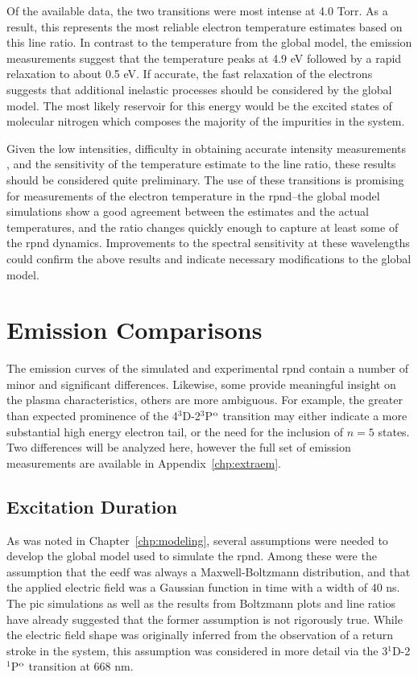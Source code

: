 Of the available data, the two transitions were most intense at 4.0 Torr. As a
result, this represents the most reliable electron temperature estimates based
on this line ratio. In contrast to the temperature from the global model, the
emission measurements suggest that the temperature peaks at 4.9 eV followed by a
rapid relaxation to about 0.5 eV. If accurate, the fast relaxation of the
electrons suggests that additional inelastic processes should be considered by
the global model. The most likely reservoir for this energy would be the excited
states of molecular nitrogen which composes the majority of the impurities in
the system.

Given the low intensities, difficulty in obtaining accurate intensity
measurements \cite{Griem2005}, and the sensitivity of the temperature estimate
to the line ratio, these results should be considered quite preliminary. The use
of these transitions is promising for measurements of the electron temperature
in the \acs{rpnd}--the global model simulations show a good agreement between
the estimates and the actual temperatures, and the ratio changes quickly enough
to capture at least some of the \acs{rpnd} dynamics. Improvements to the
spectral sensitivity at these wavelengths could confirm the above results and
indicate necessary modifications to the global model.

\section{Emission Comparisons}

The emission curves of the simulated and experimental \acs{rpnd} contain a
number of minor and significant differences. Likewise, some provide meaningful
insight on the plasma characteristics, others are more ambiguous. For example,
the greater than expected prominence of the 4$^3$D-2$^3$P$^\mathrm{o}$ transition may
either indicate a more substantial high energy electron tail, or the need for
the inclusion of $n=5$ states. Two differences will be analyzed here, however
the full set of emission measurements are available in
Appendix~\ref{chp:extraem}.

\subsection{Excitation Duration}

As was noted in Chapter~\ref{chp:modeling}, several assumptions were needed to
develop the global model used to simulate the \acs{rpnd}. Among these were the
assumption that the \acs{eedf} was always a Maxwell-Boltzmann distribution, and
that the applied electric field was a Gaussian function in time with a width of
40 ns. The \acs{pic} simulations as well as the results from Boltzmann plots and
line ratios have already suggested that the former assumption is not rigorously
true. While the electric field shape was originally inferred from the
observation of a return stroke in the system, this assumption was considered in
more detail via the 3$^1$D-2$^1$P$^\mathrm{o}$ transition at 668 nm.

